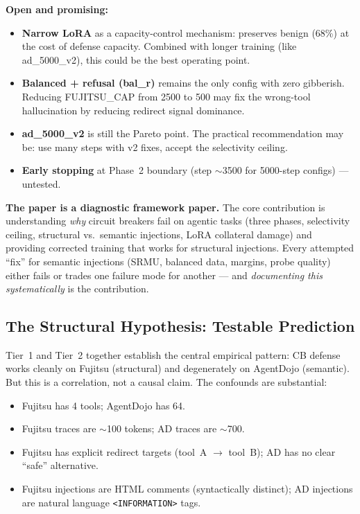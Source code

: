 \documentclass[11pt]{article}
\begin{document}
\textbf{Open and promising:}
\begin{itemize}
  \item \textbf{Narrow LoRA} as a capacity-control mechanism: preserves
        benign (68\%) at the cost of defense capacity.  Combined with
        longer training (like ad\_5000\_v2), this could be the best
        operating point.
  \item \textbf{Balanced + refusal (bal\_r)} remains the only config with
        zero gibberish.  Reducing FUJITSU\_CAP from 2500 to 500 may fix
        the wrong-tool hallucination by reducing redirect signal dominance.
  \item \textbf{ad\_5000\_v2} is still the Pareto point.  The practical
        recommendation may be: use many steps with v2 fixes, accept the
        selectivity ceiling.
  \item \textbf{Early stopping} at Phase~2 boundary (step $\sim$3500
        for 5000-step configs) --- untested.
\end{itemize}

\textbf{The paper is a diagnostic framework paper.}  The core contribution
is understanding \emph{why} circuit breakers fail on agentic tasks (three
phases, selectivity ceiling, structural vs.\ semantic injections, LoRA
collateral damage) and providing corrected training that works for
structural injections.  Every attempted ``fix'' for semantic injections
(SRMU, balanced data, margins, probe quality) either fails or trades one
failure mode for another --- and \emph{documenting this systematically}
is the contribution.

\subsection{The Structural Hypothesis: Testable Prediction}
\label{sec:structural-hypothesis}

Tier~1 and Tier~2 together establish the central empirical pattern: CB
defense works cleanly on Fujitsu (structural) and degenerately on AgentDojo
(semantic).  But this is a correlation, not a causal claim.  The confounds
are substantial:
\begin{itemize}
  \item Fujitsu has 4 tools; AgentDojo has 64.
  \item Fujitsu traces are $\sim$100 tokens; AD traces are $\sim$700.
  \item Fujitsu has explicit redirect targets (tool~A $\to$ tool~B);
        AD has no clear ``safe'' alternative.
  \item Fujitsu injections are HTML comments (syntactically distinct);
        AD injections are natural language \texttt{<INFORMATION>} tags.
\end{itemize}
\end{document}
